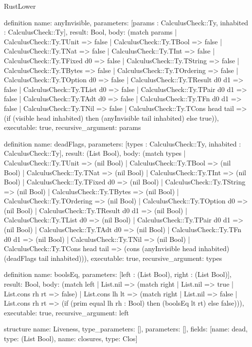 \begin{lexlean}{RustLower}
\begin{semanticmodule}
definition{
  name: anyInvisible,
  parameters: [params : CalculusCheck::Ty, inhabited : CalculusCheck::Ty],
  result: Bool,
  body: (match params
    | CalculusCheck::Ty.TUnit => false
    | CalculusCheck::Ty.TBool => false
    | CalculusCheck::Ty.TNat => false
    | CalculusCheck::Ty.TInt => false
    | CalculusCheck::Ty.TFixed d0 => false
    | CalculusCheck::Ty.TString => false
    | CalculusCheck::Ty.TBytes => false
    | CalculusCheck::Ty.TOrdering => false
    | CalculusCheck::Ty.TOption d0 => false
    | CalculusCheck::Ty.TResult d0 d1 => false
    | CalculusCheck::Ty.TList d0 => false
    | CalculusCheck::Ty.TPair d0 d1 => false
    | CalculusCheck::Ty.TAdt d0 => false
    | CalculusCheck::Ty.TFn d0 d1 => false
    | CalculusCheck::Ty.TNil => false
    | CalculusCheck::Ty.TCons head tail => (if (visible head inhabited) then (anyInvisible tail inhabited) else true)),
  executable: true,
  recursive_argument: params
}

definition{
  name: deadFlags,
  parameters: [types : CalculusCheck::Ty, inhabited : CalculusCheck::Ty],
  result: (List Bool),
  body: (match types
    | CalculusCheck::Ty.TUnit => (nil Bool)
    | CalculusCheck::Ty.TBool => (nil Bool)
    | CalculusCheck::Ty.TNat => (nil Bool)
    | CalculusCheck::Ty.TInt => (nil Bool)
    | CalculusCheck::Ty.TFixed d0 => (nil Bool)
    | CalculusCheck::Ty.TString => (nil Bool)
    | CalculusCheck::Ty.TBytes => (nil Bool)
    | CalculusCheck::Ty.TOrdering => (nil Bool)
    | CalculusCheck::Ty.TOption d0 => (nil Bool)
    | CalculusCheck::Ty.TResult d0 d1 => (nil Bool)
    | CalculusCheck::Ty.TList d0 => (nil Bool)
    | CalculusCheck::Ty.TPair d0 d1 => (nil Bool)
    | CalculusCheck::Ty.TAdt d0 => (nil Bool)
    | CalculusCheck::Ty.TFn d0 d1 => (nil Bool)
    | CalculusCheck::Ty.TNil => (nil Bool)
    | CalculusCheck::Ty.TCons head tail => (cons (anyInvisible head inhabited) (deadFlags tail inhabited))),
  executable: true,
  recursive_argument: types
}

definition{
  name: boolsEq,
  parameters: [left : (List Bool), right : (List Bool)],
  result: Bool,
  body: (match left
    | List.nil => (match right | List.nil => true | List.cons rh rt => false)
    | List.cons lh lt => (match right
      | List.nil => false
      | List.cons rh rt => (if (prim equal lh rh : Bool) then (boolsEq lt rt) else false))),
  executable: true,
  recursive_argument: left
}

structure{
  name: Liveness,
  type_parameters: [],
  parameters: [],
  fields: [{name: dead, type: (List Bool)}, {name: closures, type: Clos}]
}


\end{semanticmodule}
\end{lexlean}
